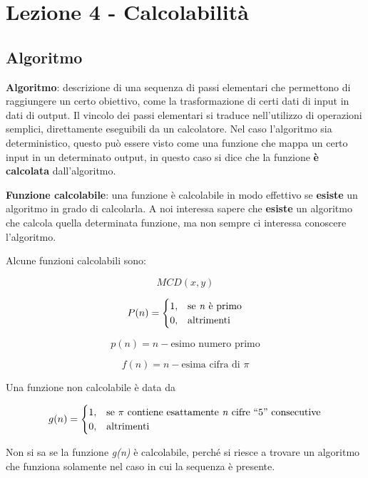 
\chapter{Lezione 4 - Calcolabilità}\label{lezione-4-computabilituxe0---calcolabilituxe0}

\section{Algoritmo}\label{algoritmo}

\textbf{Algoritmo}: descrizione di una sequenza di passi elementari che
permettono di raggiungere un certo obiettivo, come la trasformazione di
certi dati di input in dati di output. Il vincolo dei passi elementari
si traduce nell'utilizzo di operazioni semplici, direttamente eseguibili
da un calcolatore. Nel caso l'algoritmo sia deterministico, questo può
essere visto come una funzione che mappa un certo input in un
determinato output, in questo caso si dice che la funzione \textbf{è
calcolata} dall'algoritmo.

\textbf{Funzione calcolabile}: una funzione è calcolabile in modo
effettivo se \textbf{esiste} un algoritmo in grado di calcolarla. A noi
interessa sapere che \textbf{esiste} un algoritmo che calcola quella
determinata funzione, ma non sempre ci interessa conoscere l'algoritmo.

Alcune funzioni calcolabili sono:

$$ MCD(x,y) $$

$$
P(n) = \begin{cases}
1, &\text{se \textit{n} è primo} \\
0, &\text{altrimenti}
\end{cases}
$$

$$ p(n) = n-\text{esimo numero primo}$$

$$ f(n) = n-\text{esima cifra di }\pi$$

Una funzione non calcolabile è data da

$$
g(n) = \begin{cases}
1, &\text{se $\pi$ contiene esattamente \textit{n} cifre ``5'' consecutive} \\
0, &\text{altrimenti}
\end{cases}
$$

Non si sa se la funzione \emph{g(n)} è calcolabile, perché si riesce a
trovare un algoritmo che funziona solamente nel caso in cui la sequenza
è presente.

